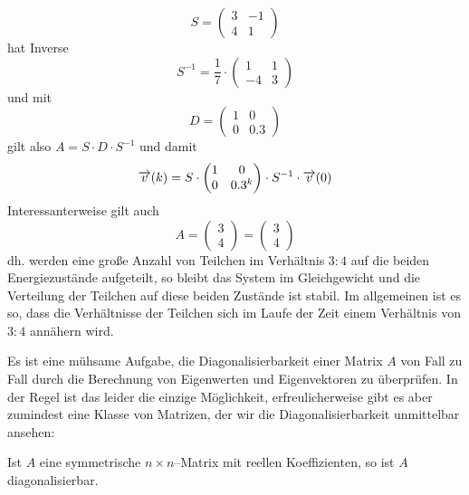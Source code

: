 \begin{beispiel}
  	$$ S = \left( \begin{matrix} 3 & -1 \\ 4 & 1 \end{matrix} \right) $$
hat Inverse
  	$$ S^{-1} = \frac {1}{7} \cdot \left( \begin{matrix} 1 & 1 \\ -4 & 3 \end{matrix} \right) $$
und mit 
  	$$ D = \left( \begin{matrix} 1 & 0 \\ 0 & 0.3 \end{matrix} \right) $$
gilt also $A = S \cdot D \cdot S^{-1}$ und damit
  	$$ \overrightarrow{v}(k) = S \cdot \left( \begin{matrix} 1 & 0 \\ 0 & 0.3^k \end{matrix} \right) \cdot S^{-1} 
	\cdot \overrightarrow{v}(0) $$
Interessanterweise gilt auch 
	$$ A = \begin{pmatrix} 3 \\ 4 \end{pmatrix} =  \begin{pmatrix} 3 \\ 4 \end{pmatrix} $$
dh. werden eine große Anzahl von Teilchen im Verhältnis $3:4$ auf die beiden Energiezustände aufgeteilt, so 
bleibt das System im Gleichgewicht und die Verteilung der Teilchen auf diese beiden  Zustände ist stabil. Im 
allgemeinen ist es so, dass die Verhältnisse der Teilchen sich im Laufe der Zeit einem Verhältnis von $3:4$ 
annähern wird. 
\end{beispiel}

\medbreak

Es ist eine mühsame Aufgabe, die Diagonalisierbarkeit einer Matrix $A$ von Fall zu Fall durch die 
Berechnung von Eigenwerten und Eigenvektoren  zu überprüfen. In der Regel ist das leider die 
einzige Möglichkeit, erfreulicherweise gibt es aber zumindest eine Klasse von Matrizen, der wir 
die Diagonalisierbarkeit unmittelbar ansehen:

\begin{satz}\label{ew_matrix_sym_diag}
Ist $A$ eine symmetrische $n \times n$--Matrix mit reellen Koeffizienten, so ist $A$ diagonalisierbar.
\end{satz}

